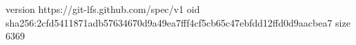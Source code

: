 version https://git-lfs.github.com/spec/v1
oid sha256:2cfd5411871adb57634670d9a49ea7fff4cf5cb65c47ebfdd12ffd0d9aacbea7
size 6369
